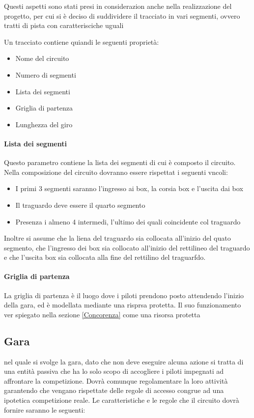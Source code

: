 \documentclass[a4paper,11pt, twoside]{book}
\begin{document}
	Questi aspetti sono stati presi in considerazion anche nella realizzazione del progetto, per cui si è deciso
	di suddividere il tracciato in vari segmenti, ovvero tratti di pista con caratterisciche uguali
	
	Un tracciato contiene quiandi le seguenti proprietà:
	
	\begin{itemize}
	  \item Nome del circuito
	  \item Numero di segmenti
	  \item Lista dei segmenti
	  \item Griglia di partenza
	  \item Lunghezza del giro
	\end{itemize}
	
	\paragraph{Lista dei segmenti}
	  Questo parametro contiene la lista dei segmenti di cui è composto il circuito. Nella composizione
	  del circuito dovranno essere rispettat i seguenti vncoli:
	  
	  \begin{itemize}
	    \item I primi 3 segmenti saranno l'ingresso ai box, la corsia box e l'uscita dai box
	    \item Il traguardo deve essere il quarto segmento
	    \item Presenza i almeno 4 intermedi, l'ultimo dei quali coincidente col traguardo
	  \end{itemize}
	  
	  Inoltre si assume che la liena del traguardo sia collocata all'inizio del quato segmento, che 
	  l'ingresso dei box sia collocato all'inizio del rettilineo del traguardo e che l'uscita box sia collocata
	  alla fine del rettilino del traguarfdo.

	\paragraph{Griglia di partenza}
	  La griglia di partenza è il luogo dove i piloti prendono posto attendendo l'inizio della gara, ed è modellata
	  mediante una risprsa protetta.
	  Il suo funzionamento ver spiegato nella sezione \ref{Concorenza}
	  come una risorsa protetta
	
	\subsection{Gara}
	nel quale si svolge la gara, dato che non deve 
	eseguire alcuna azione si
	tratta di una entità passiva che ha lo solo scopo di accogliere i piloti impegnati ad affrontare la
	competizione.
	Dovrà comunque regolamentare la loro attività garantendo che vengano rispettate delle regole di accesso congrue
	ad una ipotetica competizione reale. 
	Le caratteristiche e le regole che il circuito dovrà fornire saranno le seguenti:
	
\end{document}
